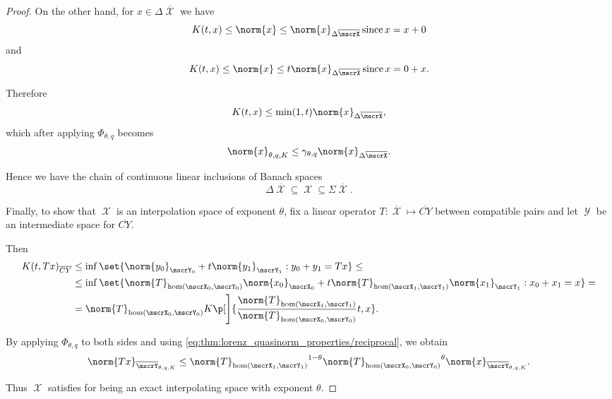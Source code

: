 \begin{proof}
  On the other hand, for \( x \in \Delta \overline{\mscrX} \) we have
  \begin{equation*}
    K(t, x) \leq \norm{x} \leq \norm{x}_{\Delta \overline{\mscrX}} \T{since} x = x + 0
  \end{equation*}
  and
  \begin{equation*}
    K(t, x) \leq \norm{x} \leq t \norm{x}_{\Delta \overline{\mscrX}} \T{since} x = 0 + x.
  \end{equation*}

  Therefore
  \begin{equation*}
    K(t, x) \leq \min(1, t) \norm{x}_{\Delta \overline{\mscrX}},
  \end{equation*}
  which after applying \( \Phi_{\theta,q} \) becomes
  \begin{equation*}
    \norm{x}_{\theta,q,K} \leq \gamma_{\theta,q} \norm{x}_{\Delta \overline{\mscrX}}.
  \end{equation*}

  Hence we have the chain of continuous linear inclusions of Banach spaces
  \begin{equation*}
    \Delta \overline{\mscrX} \subseteq \mscrX \subseteq \Sigma \overline{\mscrX}.
  \end{equation*}

  Finally, to show that \( \mscrX \) is an interpolation space of exponent \( \theta \), fix a linear operator \( T: \overline{\mscrX} \mapsto \overline{CY} \) between compatible pairs and let \( \mscrY \) be an intermediate space for \( \overline{CY} \).

  Then
  \begin{align*}
    K(t, Tx)_{\overline{CY}}
    &\leq
    \inf \set{ \norm{y_0}_{\mscrY_0} + t \norm{y_1}_{\mscrY_1} : y_0 + y_1 = Tx }
    \leq \\ &\leq
    \inf \set{ \norm{T}_{\hom(\mscrX_0, \mscrY_0)} \norm{x_0}_{\mscrX_0} + t \norm{T}_{\hom(\mscrX_1, \mscrY_1)} \norm{x_1}_{\mscrY_1} : x_0 + x_1 = x }
    = \\ &=
    \norm{T}_{\hom(\mscrX_0, \mscrY_0)} K\p[\Bigg]{\frac {\norm{T}_{\hom(\mscrX_1, \mscrY_1)}} {\norm{T}_{\hom(\mscrX_0, \mscrY_0)}} t, x}.
  \end{align*}

  By applying \( \Phi_{\theta,q} \) to both sides and using \eqref{eq:thm:lorenz_quasinorm_properties/reciprocal}, we obtain
  \begin{equation*}
    \norm{Tx}_{\overline{\mscrY}_{\theta,q,K}}
    \leq
    {\norm{T}_{\hom(\mscrX_1, \mscrY_1)}}^{1 - \theta} {\norm{T}_{\hom(\mscrX_0, \mscrY_0)}}^{\theta} \norm{x}_{\overline{\mscrY}_{\theta,q,K}}.
  \end{equation*}

  Thus \( \mscrX \) satisfies  for being an exact interpolating space with exponent \( \theta \).
\end{proof}

